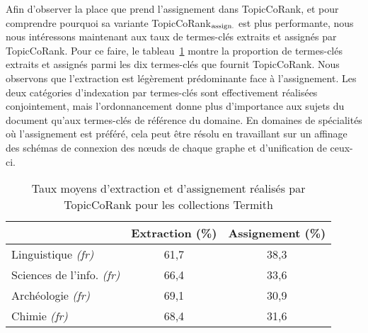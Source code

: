         Afin d'observer la place que prend l'assignement dans TopicCoRank, et
        pour comprendre pourquoi sa variante TopicCoRank$_\textnormal{assign.}$
        est plus performante, nous nous intéressons maintenant aux taux de
        termes-clés extraits et assignés par TopicCoRank. Pour ce faire, le
        tableau~\ref{tab:assignment_ratio_termith} montre la proportion de
        termes-clés extraits et assignés parmi les dix termes-clés que fournit
        TopicCoRank. Nous observons que l'extraction est légèrement prédominante
        face à l'assignement. Les deux catégories d'indexation par termes-clés
        sont effectivement réalisées conjointement, mais l'ordonnancement donne
        plus d'importance aux sujets du document qu'aux termes-clés de référence
        du domaine. En domaines de spécialités où l'assignement est préféré,
        cela peut être résolu en travaillant sur un affinage des schémas de
        connexion des n\oe{}uds de chaque graphe et d'unification de ceux-ci.
        \begin{table}[t]
          \centering
          \begin{tabular}{l|c|c}
              \toprule
              & Extraction (\%) & Assignement (\%)\\
              \hline
              Linguistique \textit{(fr)} & 61,7 & 38,3\\
              Sciences de l'info. \textit{(fr)} & 66,4 & 33,6\\
              Archéologie \textit{(fr)} & 69,1 & 30,9\\
              Chimie \textit{(fr)} & 68,4 & 31,6\\
              \bottomrule
          \end{tabular}
          \caption{Taux moyens d'extraction et d'assignement réalisés par
                   TopicCoRank pour les collections Termith
                   \label{tab:assignment_ratio_termith}}
        \end{table}

